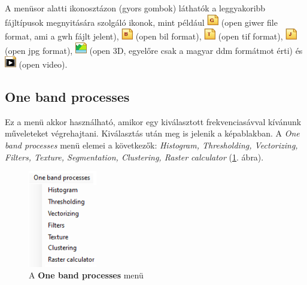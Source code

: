 \documentclass[a4paper,12pt]{book}
\begin{document}
A menüsor alatti ikonosztázon (gyors gombok) láthatók a leggyakoribb fájltípusok megnyitására szolgáló ikonok, mint például \includegraphics[width=0.5cm]{opengiwer.png} (open giwer file format, ami a gwh fájlt jelent), \includegraphics[width=0.5cm]{openbil.png} (open bil format), \includegraphics[width=0.5cm]{opentif.png} (open tif format), \includegraphics[width=0.5cm]{openjpg.png} (open jpg format), \includegraphics[width=0.5cm]{3d.png} (open 3D, egyelőre csak a magyar ddm formátmot érti) és \includegraphics[width=0.5cm]{openvideo.png} (open video).

	
\subsection{One band processes}

 
Ez a menü akkor használható, amikor egy kiválasztott frekvenciasávval kívánunk műveleteket végrehajtani. Kiválasztás után meg is jelenik a képablakban. %
 A \textit{One band processes} menü elemei a következők: \textit{Histogram, Thresholding, Vectorizing, Filters, Texture, Segmentation, Clustering, Raster calculator} (\ref{fig:onebandmenu}. ábra).

\begin{figure}
	\centering
	\includegraphics[width=3cm]{onebandmenu.png}
	\caption{A \textbf{One band processes} menü}
	\label{fig:onebandmenu}
\end{figure}
\end{document}
